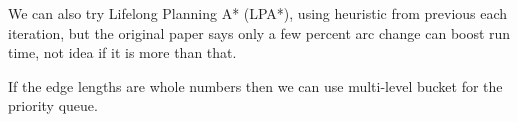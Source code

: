 
We can also try Lifelong Planning A* (LPA*), using heuristic from previous each iteration, but the original paper says only a few percent arc change can boost run time, not idea if it is more than that. 

If the edge lengths are whole numbers then we can use multi-level bucket for the priority queue.



